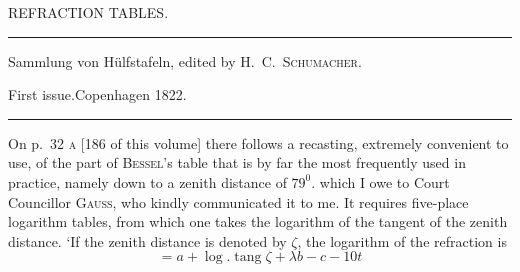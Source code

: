 \clearpage{}%
\begin{center}
{\small REFRACTION TABLES.\par}
\medskip\hrule\medskip
{\small Sammlung von Hülfstafeln, edited by H.\ C.\ \textsc{Schumacher}.\par
First issue.\quad Copenhagen 1822.\par}
\medskip\hrule
\end{center}\medskip
On p.\ 32 \textsc{a} [186 of this volume] there follows a recasting, extremely convenient to use, of the part of \textsc{Bessel}’s table that is by far the most frequently used in practice, namely down to a zenith distance of $79^0$. which I owe to Court Councillor \textsc{Gauss}, who kindly communicated it to me. It requires five-place logarithm tables, from which one takes the logarithm of the tangent of the zenith distance. `If the zenith distance is denoted by $\zeta$, the logarithm of the refraction is
\[
=a+\log.\operatorname{tang}\zeta+\lambda b-c-10t
\]

